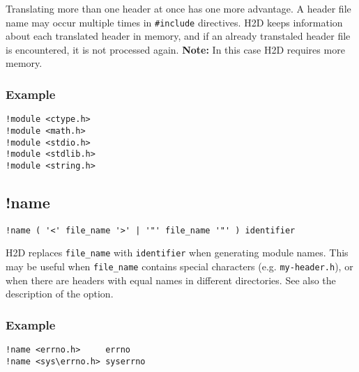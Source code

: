 Translating more than one header at once has one more advantage.
A header file name may occur multiple times in {\tt \#include} directives.
H2D keeps information about each translated header in memory, and if an
already transtaled header file is encountered, it is not processed again.
{\bf Note:} In this case H2D requires more memory.

\subsubsection*{Example}

\begin{verbatim}
!module <ctype.h>
!module <math.h>
!module <stdio.h>
!module <stdlib.h>
!module <string.h>
\end{verbatim}

\subsection{!name}
\label{project:name}

\begin{verbatim}
!name ( '<' file_name '>' | '"' file_name '"' ) identifier
\end{verbatim}

H2D replaces {\tt file\_name} with {\tt identifier} when generating
module names. This may be useful when {\tt file\_name} contains special
characters (e.g. {\tt my-header.h}), or when there are headers with
equal names in different directories. See also the description
of the  option.

\subsubsection*{Example}

\verb'!name <errno.h>     errno'\\
\verb'!name <sys\errno.h> syserrno'


